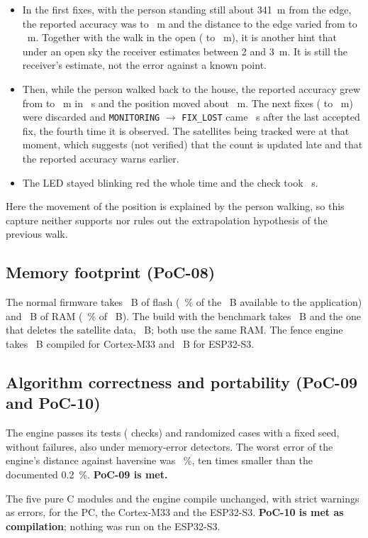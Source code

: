 \begin{itemize}
  \item In the first \dTailStillFixes{} fixes, with the person standing still about 341~m from the edge, the reported
        accuracy was \dTailStillAccLow{} to \dTailStillAccHigh~m and the distance to the edge varied from \dTailStillDistLow{} to
        \dTailStillDistHigh~m. Together with the walk in the open (\dWalkAccMin{} to \dWalkAccMax~m), it is another hint
        that under an open sky the receiver estimates between 2 and 3~m. It is still the receiver's estimate, not
        the error against a known point.
  \item Then, while the person walked back to the house, the reported accuracy grew from \dTailStillAccHigh{} to
        \dTailAccTo~m in \dTailDegradeS~s and the position moved about \dTailShiftM~m. The next \dTailIgnored{} fixes
        (\dTailIgnoredLow{} to \dTailIgnoredHigh~m) were discarded and \texttt{MONITORING} $\to$ \texttt{FIX\_LOST} came
        \dTailLostS~s after the last accepted fix, the fourth time it is observed. The satellites being tracked were
        \dTailSats{} at that moment, which suggests (not verified) that the count is updated late and that the reported accuracy
        warns earlier.
  \item The LED stayed blinking red the whole time and the check took \dTailCheckUs~\textmu s.
\end{itemize}

Here the movement of the position is explained by the person walking, so this capture neither supports nor rules
out the extrapolation hypothesis of the previous walk.

\subsection{Memory footprint (PoC-08)}

The normal firmware takes \dFlashBytes~B of flash (\dFlashPercent~\% of the \dFlashRegion~B available to the
application) and \dRamBytes~B of RAM (\dRamPercent~\% of \dRamRegion~B). The build with the benchmark takes
\dFlashBench~B and the one that deletes the satellite data, \dFlashCold~B; both use the same RAM. The fence
engine takes \dEngineBytesCmThree~B compiled for Cortex-M33 and \dEngineBytesEsp~B for ESP32-S3.

\subsection{Algorithm correctness and portability (PoC-09 and PoC-10)}

The engine passes its \dHostTests{} tests (\dHostChecks{} checks) and \dStressCases{} randomized cases with a
fixed seed, without failures, also under memory-error detectors. The worst error of the engine's distance
against haversine was \dStressWorstErrorPct~\%, ten times smaller than the documented 0.2~\%. \textbf{PoC-09 is
met.}

The five pure C modules and the engine compile unchanged, with strict warnings as errors, for the PC, the
Cortex-M33 and the ESP32-S3. \textbf{PoC-10 is met as compilation}; nothing was run on the ESP32-S3.
